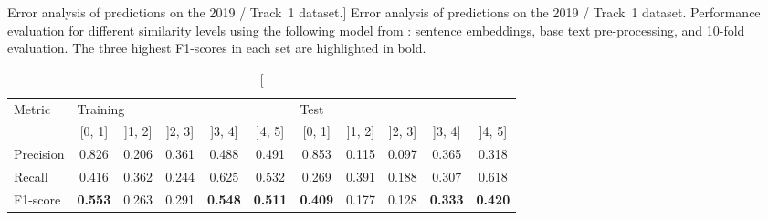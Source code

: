 \begingroup

\setlength{\tabcolsep}{6.4pt}

\begin{table}[!t]

\caption%
[Error analysis of predictions on the 2019 / Track~1 dataset.]%
{Error analysis of predictions on the 2019 / Track~1 dataset. Performance evaluation for different similarity levels using the following model from : sentence embeddings, base text pre-processing, and 10-fold evaluation. The three highest F1-scores in each set are highlighted in bold.}
\label{tab:2019-n2c2-analysis}

\centering

\small

\begin{tabular}{lcccccccccc}

\toprule

Metric & \multicolumn{5}{l}{Training} & \multicolumn{5}{l}{Test}\\

\cmidrule(r){1-1}\cmidrule(lr){2-6}\cmidrule(l){7-11}

& [0, 1] & ]1, 2] & ]2, 3] & ]3, 4] & ]4, 5] & [0, 1] & ]1, 2] & ]2, 3] & ]3, 4] & ]4, 5]\\

Precision & 0.826 & 0.206 & 0.361 & 0.488 & 0.491 & 0.853 & 0.115 & 0.097 & 0.365 & 0.318\\
Recall    & 0.416 & 0.362 & 0.244 & 0.625 & 0.532 & 0.269 & 0.391 & 0.188 & 0.307 & 0.618\\

F1-score  & \textbf{0.553} & 0.263 & 0.291 & \textbf{0.548} & \textbf{0.511} & \textbf{0.409} & 0.177 & 0.128 & \textbf{0.333} & \textbf{0.420}\\

\bottomrule

\end{tabular}
\end{table}
\endgroup

%

